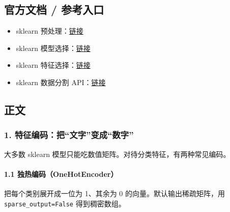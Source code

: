 \subsection{官方文档 /
参考入口}\label{ux5b98ux65b9ux6587ux6863-ux53c2ux8003ux5165ux53e3-7}

\begin{itemize}
\tightlist
\item
  sklearn
  预处理：\href{https://scikit-learn.org/stable/modules/preprocessing.html}{链接}
\item
  sklearn
  模型选择：\href{https://scikit-learn.org/stable/modules/cross_validation.html}{链接}
\item
  sklearn
  特征选择：\href{https://scikit-learn.org/stable/modules/feature_selection.html}{链接}
\item
  sklearn 数据分割
  API：\href{https://scikit-learn.org/stable/modules/generated/sklearn.model_selection.train_test_split.html}{链接}
\end{itemize}

\subsection{正文}\label{ux6b63ux6587}

\subsubsection{1.
特征编码：把``文字''变成``数字''}\label{ux7279ux5f81ux7f16ux7801ux628aux6587ux5b57ux53d8ux6210ux6570ux5b57}

大多数 sklearn 模型只能吃数值矩阵。对待分类特征，有两种常见编码。

\paragraph{1.1
独热编码（OneHotEncoder）}\label{ux72ecux70edux7f16ux7801onehotencoder}

把每个类别展开成一位为 1、其余为 0 的向量。默认输出稀疏矩阵，用
\texttt{sparse\_output=False} 得到稠密数组。

